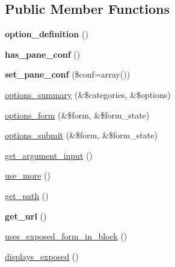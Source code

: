 \subsection*{Public Member Functions}
\begin{DoxyCompactItemize}
\item 
\hypertarget{classviews__content__plugin__display__panel__pane_ad8ce96489944fa544bb7e13173b25a8e}{
{\bfseries option\_\-definition} ()}
\label{classviews__content__plugin__display__panel__pane_ad8ce96489944fa544bb7e13173b25a8e}

\item 
\hypertarget{classviews__content__plugin__display__panel__pane_a057add883aaf777c6e7d838f888ba886}{
{\bfseries has\_\-pane\_\-conf} ()}
\label{classviews__content__plugin__display__panel__pane_a057add883aaf777c6e7d838f888ba886}

\item 
\hypertarget{classviews__content__plugin__display__panel__pane_ab39834ee329ef5a2ed303f6ed2912bbb}{
{\bfseries set\_\-pane\_\-conf} (\$conf=array())}
\label{classviews__content__plugin__display__panel__pane_ab39834ee329ef5a2ed303f6ed2912bbb}

\item 
\hyperlink{classviews__content__plugin__display__panel__pane_aa93bc6c55f47c07f6d36695bea916b43}{options\_\-summary} (\&\$categories, \&\$options)
\item 
\hyperlink{classviews__content__plugin__display__panel__pane_a9ae46f16b092629f3222cd0e0f65d0f9}{options\_\-form} (\&\$form, \&\$form\_\-state)
\item 
\hyperlink{classviews__content__plugin__display__panel__pane_a5ee46f64275ee0fe1865b98f1b7811bf}{options\_\-submit} (\&\$form, \&\$form\_\-state)
\item 
\hyperlink{classviews__content__plugin__display__panel__pane_acde0ff3c4cbb95f59c011bc7b26c143e}{get\_\-argument\_\-input} ()
\item 
\hyperlink{classviews__content__plugin__display__panel__pane_a4d0a60ad1d64917b0e90495bd7fe5f30}{use\_\-more} ()
\item 
\hyperlink{classviews__content__plugin__display__panel__pane_a363668d682a3d3489aef9df3adcbc7b7}{get\_\-path} ()
\item 
\hypertarget{classviews__content__plugin__display__panel__pane_ac897074e92c79d05274289734dc2120f}{
{\bfseries get\_\-url} ()}
\label{classviews__content__plugin__display__panel__pane_ac897074e92c79d05274289734dc2120f}

\item 
\hyperlink{classviews__content__plugin__display__panel__pane_a3667ee55d2a670612fe82cdbb0a5c4bd}{uses\_\-exposed\_\-form\_\-in\_\-block} ()
\item 
\hyperlink{classviews__content__plugin__display__panel__pane_a4e8cffaa9d5573babc19db650702e07f}{displays\_\-exposed} ()
\end{DoxyCompactItemize}
